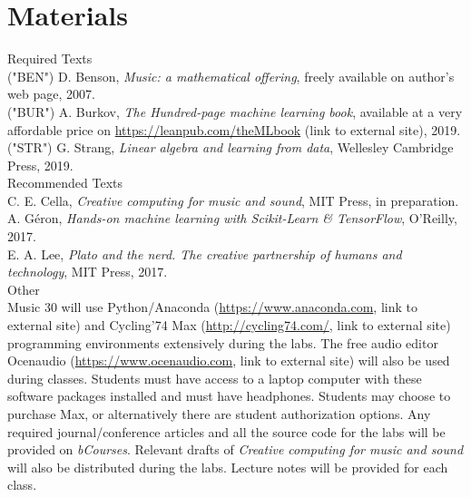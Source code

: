 \documentclass[letterpaper]{inzane_syllabus} %
\begin{document}
\vspace{0.5cm} %
\section{Materials}

{\color{myCOLOR} Required Texts}\\
("BEN") D. Benson, \textit{Music: a mathematical offering}, freely available on author's web page, 2007.\\
("BUR") A. Burkov, \textit{The Hundred-page machine learning book}, available at a very affordable price on \url{https://leanpub.com/theMLbook} (link to external site), 2019.\\
("STR") G. Strang, \textit{Linear algebra and learning from data}, Wellesley Cambridge Press, 2019.\\

{\color{myCOLOR} Recommended Texts}\\
C. E. Cella, \textit{Creative computing for music and sound}, MIT Press, in preparation. \\
A. G\'eron, \textit{Hands-on machine learning with Scikit-Learn \& TensorFlow}, O'Reilly, 2017.\\
E. A. Lee, \textit{Plato and the nerd. The creative partnership of humans and technology}, MIT Press, 2017.\\

{\color{myCOLOR} Other}\\
Music 30 will use Python/Anaconda (\url{https://www.anaconda.com}, link to external site) and Cycling’74 Max (\url{http://cycling74.com/}, link to external site) programming environments extensively during the labs. The free audio editor Ocenaudio (\url{https://www.ocenaudio.com}, link to external site) will also be used during classes. Students must have access to a laptop computer with these software packages installed and must have headphones. Students may choose to purchase Max, or alternatively there are student authorization options. Any required journal/conference articles and all the source code for the labs will be provided on \emph{bCourses}. Relevant drafts of \emph{Creative computing for music and sound} will also be distributed during the labs. Lecture notes will be provided for each class.
\end{document}
